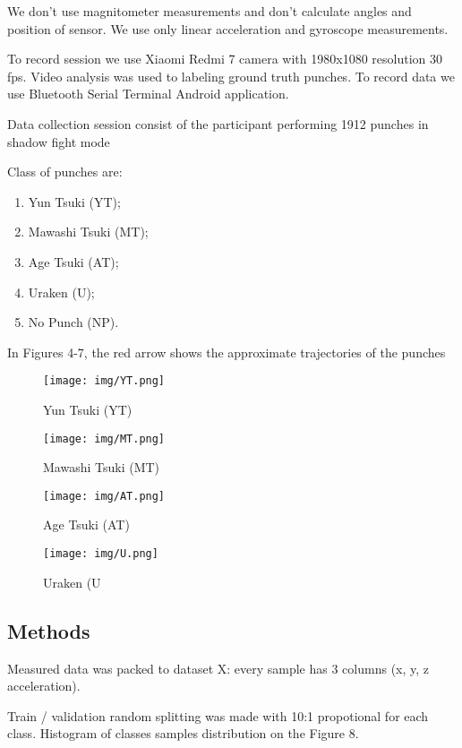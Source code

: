 \documentclass[sport,article,submit,moreauthors,pdftex]{Definitions/mdpi}
\begin{document}
We don't use magnitometer measurements and don't calculate angles and position of sensor. We use only linear acceleration and gyroscope measurements.

To record session we use Xiaomi Redmi 7 camera with 1980x1080 resolution 30 fps. Video analysis was used to labeling ground truth punches. To record data we use Bluetooth Serial Terminal Android application.

Data collection session consist of the participant performing 1912 punches in shadow fight mode

Class of punches are:

\begin{enumerate}
\item	Yun Tsuki (YT);
\item	Mawashi Tsuki (MT);
\item	Age Tsuki (AT);
\item	Uraken (U);
\item	No Punch (NP).
\end{enumerate}

In Figures 4-7, the red arrow shows the approximate trajectories of the punches

\begin{figure}[H]
\texttt{[image: img/YT.png]}
\caption{Yun Tsuki (YT)}
\end{figure}

\begin{figure}[H]
\texttt{[image: img/MT.png]}
\caption{Mawashi Tsuki (MT)}
\end{figure}

\begin{figure}[H]
\texttt{[image: img/AT.png]}
\caption{Age Tsuki (AT)}
\end{figure}

\begin{figure}[H]
\texttt{[image: img/U.png]}
\caption{Uraken (U}
\end{figure}

\subsection{Methods}

Measured data was packed to dataset X: every sample has 3 columns (x, y, z acceleration).

Train / validation random splitting was made with 10:1 propotional for each class. Histogram of classes samples distribution on the Figure 8.
\end{document}

